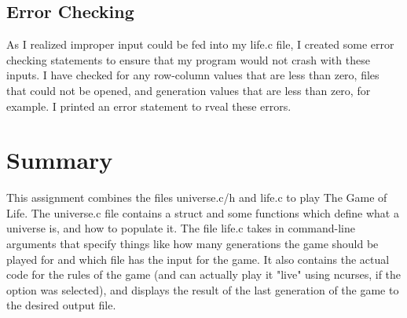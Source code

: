 \documentclass[11pt]{article}
\begin{document}
\subsection{Error Checking}
As I realized improper input could be fed into my life.c file, I created some error checking statements to ensure that my program would not crash with these inputs. I have checked for any row-column values that are less than zero, files that could not be opened, and generation values that are less than zero, for example. I printed an error statement to rveal these errors.

\section{Summary}
This assignment combines the files universe.c/h and life.c to play The Game of Life. The universe.c file contains a struct and some functions which define what a universe is, and how to populate it. The file life.c takes in command-line arguments that specify things like how many generations the game should be played for and which file has the input for the game. It also contains the actual code for the rules of the game (and can actually play it "live" using ncurses, if the option was selected), and displays the result of the last generation of the game to the desired output file.
\end{document}
